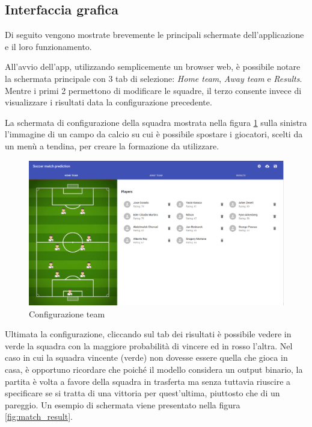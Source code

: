 \documentclass[hidelinks, 12pt]{article}
\begin{document}
\subsection{Interfaccia grafica}

Di seguito vengono mostrate brevemente le principali schermate dell'applicazione e il loro funzionamento.

All'avvio dell'app, utilizzando semplicemente un browser web, è possibile notare la schermata principale con 3 tab di selezione: {\it Home team}, {\it Away team} e {\it Results}. Mentre i primi 2 permettono di modificare le squadre, il terzo consente invece di visualizzare i risultati data la configurazione precedente.

La schermata di configurazione della squadra mostrata nella figura \ref{fig:team_config} sulla sinistra l'immagine di un campo da calcio su cui è possibile spostare i giocatori, scelti da un menù a tendina, per creare la formazione da utilizzare. 

\begin{figure}[H]
	\centering
	\includegraphics[scale=0.35]{images/07_02_team_config.png}
	\caption[Configurazione team]{Configurazione team}
	\label{fig:team_config}
\end{figure}

Ultimata la configurazione, cliccando sul tab dei risultati è possibile vedere in verde la squadra con la maggiore probabilità di vincere ed in rosso l'altra. Nel caso in cui la squadra vincente (verde) non dovesse essere quella che gioca in casa, è opportuno ricordare che poiché il modello considera un output binario, la partita è volta a favore della squadra in trasferta ma senza tuttavia riuscire a specificare se si tratta di una vittoria per quest'ultima, piuttosto che di un pareggio. Un esempio di schermata viene presentato nella figura \ref{fig:match_result}. 
\end{document}
